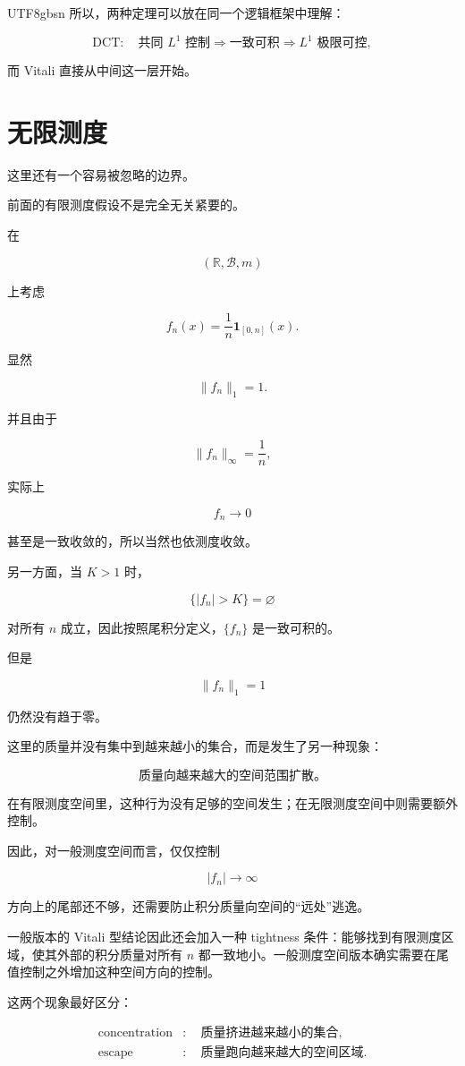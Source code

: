 \documentclass[11pt]{article}
\begin{document}
\begin{CJK*}{UTF8}{gbsn}
所以，两种定理可以放在同一个逻辑框架中理解：

\[
\text{DCT}
:
\quad
\text{共同 }L^1\text{ 控制}
\Longrightarrow
\text{一致可积}
\Longrightarrow
L^1\text{ 极限可控},
\]

而 Vitali 直接从中间这一层开始。


\section{无限测度}


这里还有一个容易被忽略的边界。

前面的有限测度假设不是完全无关紧要的。

在

\[
(\mathbb R,\mathcal B,m)
\]

上考虑

\[
f_n(x)
=
\frac1n\mathbf1_{[0,n]}(x).
\]

显然

\[
\|f_n\|_1=1.
\]

并且由于

\[
\|f_n\|_\infty=\frac1n,
\]

实际上

\[
f_n\to0
\]

甚至是一致收敛的，所以当然也依测度收敛。

另一方面，当 $K>1$ 时，

\[
\{|f_n|>K\}=\varnothing
\]

对所有 $n$ 成立，因此按照尾积分定义，$\{f_n\}$ 是一致可积的。

但是

\[
\|f_n\|_1=1
\]

仍然没有趋于零。

这里的质量并没有集中到越来越小的集合，而是发生了另一种现象：

\[
\text{质量向越来越大的空间范围扩散。}
\]

在有限测度空间里，这种行为没有足够的空间发生；在无限测度空间中则需要额外控制。

因此，对一般测度空间而言，仅仅控制

\[
|f_n|\to\infty
\]

方向上的尾部还不够，还需要防止积分质量向空间的“远处”逃逸。

一般版本的 Vitali 型结论因此还会加入一种 tightness 条件：能够找到有限测度区域，使其外部的积分质量对所有 $n$ 都一致地小。一般测度空间版本确实需要在尾值控制之外增加这种空间方向的控制。

这两个现象最好区分：

\[
\boxed{
\begin{aligned}
\text{concentration}
&:\quad
\text{质量挤进越来越小的集合},\\
\text{escape}
&:\quad
\text{质量跑向越来越大的空间区域}.
\end{aligned}
}
\]


\end{CJK*}
\end{document}
